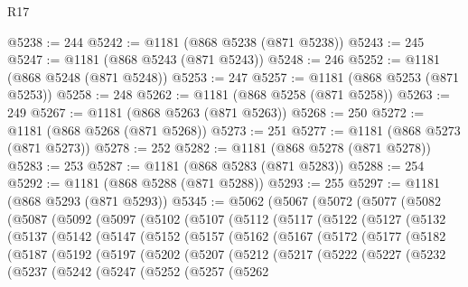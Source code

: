 \begin{lexlean}{R17}
\begin{coremodule}
@5238 := 244
@5242 := @1181 (@868 @5238 (@871 @5238))
@5243 := 245
@5247 := @1181 (@868 @5243 (@871 @5243))
@5248 := 246
@5252 := @1181 (@868 @5248 (@871 @5248))
@5253 := 247
@5257 := @1181 (@868 @5253 (@871 @5253))
@5258 := 248
@5262 := @1181 (@868 @5258 (@871 @5258))
@5263 := 249
@5267 := @1181 (@868 @5263 (@871 @5263))
@5268 := 250
@5272 := @1181 (@868 @5268 (@871 @5268))
@5273 := 251
@5277 := @1181 (@868 @5273 (@871 @5273))
@5278 := 252
@5282 := @1181 (@868 @5278 (@871 @5278))
@5283 := 253
@5287 := @1181 (@868 @5283 (@871 @5283))
@5288 := 254
@5292 := @1181 (@868 @5288 (@871 @5288))
@5293 := 255
@5297 := @1181 (@868 @5293 (@871 @5293))
@5345 := @5062
    (@5067
      (@5072
        (@5077
          (@5082
            (@5087
              (@5092
                (@5097
                  (@5102
                    (@5107
                      (@5112
                        (@5117
                          (@5122
                            (@5127
                              (@5132
                                (@5137
                                  (@5142
                                    (@5147
                                      (@5152
                                        (@5157
                                          (@5162
                                            (@5167
                                              (@5172
                                                (@5177
                                                  (@5182
                                                    (@5187
                                                      (@5192
                                                        (@5197
                                                          (@5202
                                                            (@5207
                                                              (@5212
                                                                (@5217
                                                                  (@5222
                                                                    (@5227
                                                                      (@5232
                                                                        (@5237
                                                                          (@5242
                                                                            (@5247
                                                                              (@5252
                                                                                (@5257
                                                                                  (@5262

\end{coremodule}
\end{lexlean}

